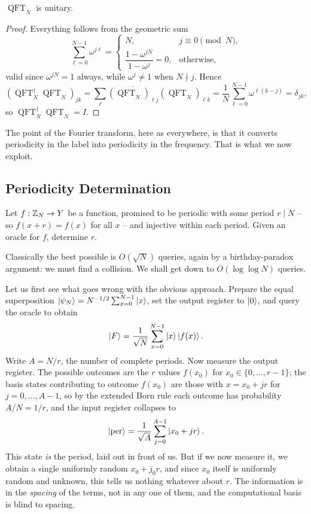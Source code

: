 \documentclass[a4paper]{scrartcl}
\newcommand{\QFT}{\operatorname{QFT}}
\begin{document}
\begin{proposition}
	$\QFT_N$ is unitary.
\end{proposition}

\begin{proof}
	Everything follows from the geometric sum
	$$\sum_{\ell=0}^{N-1}\omega^{j\ell} = \begin{cases} N, & j\equiv0 \pmod N,\\ \dfrac{1-\omega^{jN}}{1-\omega^j} = 0, &\text{otherwise,}\end{cases}$$
	valid since $\omega^{jN} = 1$ always, while $\omega^j\neq1$ when $N\nmid j$. Hence
	$$\left(\QFT_N^\dagger\QFT_N\right)_{jk} = \sum_{\ell}\overline{(\QFT_N)_{\ell j}}(\QFT_N)_{\ell k} = \frac1N\sum_{\ell=0}^{N-1}\omega^{\ell(k-j)} = \delta_{jk},$$
	so $\QFT_N^\dagger \QFT_N = I$.
\end{proof}

The point of the Fourier transform, here as everywhere, is that it converts periodicity in the label into periodicity in the frequency. That is what we now exploit.

\subsection{Periodicity Determination}\label{sec:period}

\begin{problem*}
	Let $f:\mathbb{Z}_N\to Y$ be a function, promised to be periodic with some period $r\mid N$ -- so $f(x+r) = f(x)$ for all $x$ -- and injective within each period. Given an oracle for $f$, determine $r$.
\end{problem*}

Classically the best possible is $O(\sqrt N)$ queries, again by a birthday-paradox argument: we must find a collision. We shall get down to $O(\log\log N)$ queries.

Let us first see what goes wrong with the obvious approach. Prepare the equal superposition $\ket{\psi_N} = N^{-1/2}\sum_{x=0}^{N-1}\ket x$, set the output register to $\ket0$, and query the oracle to obtain
$$\ket F = \frac1{\sqrt N}\sum_{x=0}^{N-1}\ket x\ket{f(x)}.$$
Write $A = N/r$, the number of complete periods. Now measure the output register. The possible outcomes are the $r$ values $f(x_0)$ for $x_0\in\{0,\dots,r-1\}$; the basis states contributing to outcome $f(x_0)$ are those with $x = x_0 + jr$ for $j = 0,\dots,A-1$, so by the extended Born rule each outcome has probability $A/N = 1/r$, and the input register collapses to
$$\ket{\mathrm{per}} = \frac1{\sqrt A}\sum_{j=0}^{A-1}\ket{x_0+jr}.$$
This state \emph{is} the period, laid out in front of us. But if we now measure it, we obtain a single uniformly random $x_0 + j_0r$, and since $x_0$ itself is uniformly random and unknown, this tells us nothing whatever about $r$. The information is in the \emph{spacing} of the terms, not in any one of them, and the computational basis is blind to spacing.
\end{document}
